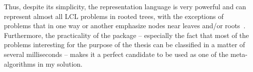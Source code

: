 Thus, despite its simplicity, the representation language is very
powerful and can represent almost all LCL problems in rooted trees, with
the exceptions of problems that in one way or another emphasize
nodes near leaves and/or roots~\cite{Balliu2021}. Furthermore, the
practicality of the package -- especially the fact that most of the
problems interesting for the purpose of the thesis can be classified
in a matter of several milliseconds -- makes it a perfect candidate
to be used as one of the meta-algorithms in my solution.


